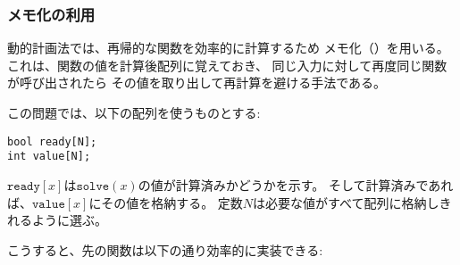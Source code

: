 \begin{comment}
\subsubsection{Using memoization}

\index{memoization}

The idea of dynamic programming is to use
\key{memoization} to efficiently calculate
values of a recursive function.
This means that the values of the function
are stored in an array after calculating them.
For each parameter, the value of the function
is calculated recursively only once, and after this,
the value can be directly retrieved from the array.

In this problem, we use arrays
\begin{lstlisting}
bool ready[N];
int value[N];
\end{lstlisting}
\end{comment}

\subsubsection{メモ化の利用}


動的計画法では、再帰的な関数を効率的に計算するため
メモ化（）を用いる。
これは、関数の値を計算後配列に覚えておき、
同じ入力に対して再度同じ関数が呼び出されたら
その値を取り出して再計算を避ける手法である。

この問題では、以下の配列を使うものとする:
\begin{lstlisting}
bool ready[N];
int value[N];
\end{lstlisting}

\begin{comment}
where $\texttt{ready}[x]$ indicates
whether the value of $\texttt{solve}(x)$ has been calculated,
and if it is, $\texttt{value}[x]$
contains this value.
The constant $N$ has been chosen so
that all required values fit in the arrays.

Now the function can be efficiently
implemented as follows:
\end{comment}

$\texttt{ready}[x]$は$\texttt{solve}(x)$の値が計算済みかどうかを示す。
そして計算済みであれば、$\texttt{value}[x]$にその値を格納する。
定数$N$は必要な値がすべて配列に格納しきれるように選ぶ。

こうすると、先の関数は以下の通り効率的に実装できる:

